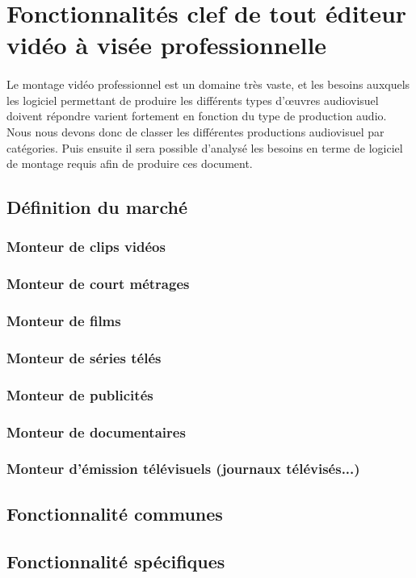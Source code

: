 \newpage
\section{Fonctionnalités clef de tout éditeur vidéo à visée
  professionnelle}

\paragraph{}
  Le montage vidéo professionnel est un domaine très vaste, et les
  besoins auxquels les logiciel permettant de produire les différents
  types d'œuvres audiovisuel doivent répondre varient fortement en
  fonction du type de production audio. Nous nous devons donc de classer
  les différentes productions audiovisuel par catégories. Puis ensuite
  il sera possible d'analysé les besoins en terme de logiciel de montage
  requis afin de produire ces document.

  \subsection{Définition du marché}
    \subsubsection {Monteur de clips vidéos}
    \subsubsection {Monteur de court métrages}
    \subsubsection {Monteur de films}
    \subsubsection {Monteur de séries télés}
    \subsubsection {Monteur de publicités}
    \subsubsection {Monteur de documentaires}
    \subsubsection {Monteur d'émission télévisuels (journaux télévisés...)}

  \subsection{Fonctionnalité communes}
  \subsection{Fonctionnalité spécifiques}
